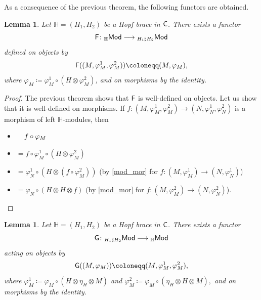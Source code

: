 \documentclass[11pt,reqno]{amsart}
\theoremstyle{plain}%
\newtheorem{lemma}[theorem]{Lemma}%
\theoremstyle{definition}
\theoremstyle{remark}
\begin{document}
As a consequence of the previous theorem, the following functors are obtained.
\begin{lemma}
Let $\mathbb{H}=(H_{1},H_{2})$ be a Hopf brace in ${\sf C}$. There exists a functor 
\[{\sf F}\colon {}_{\mathbb{H}}{\sf Mod}\longrightarrow {}_{H_{1}\sharp H_{2}}{\sf Mod}\]
defined on objects by $${\sf F}((M,\varphi_{M}^{1},\varphi_{M}^{2}))\coloneqq(M,\varphi_{M}),$$ where $\varphi_{M}\coloneqq\varphi_{M}^{1}\circ(H\otimes\varphi_{M}^{2})$, and on morphisms by the identity.
\end{lemma}
\begin{proof}
	The previous theorem shows that ${\sf F}$ is well-defined on objects. Let us show that it is well-defined on morphisms. If $f\colon (M,\varphi_{M}^{1},\varphi_{M}^{2})\rightarrow (N,\varphi_{N}^{1},\varphi_{N}^{2})$ is a morphism of left $\mathbb{H}$-modules, then
	\begin{itemize}
		\itemindent=-32pt 
		\item[ ]$\hspace{0.38cm}f\circ \varphi_{M}$
		\item[] $=f\circ\varphi_{M}^{1}\circ(H\otimes\varphi_{M}^{2})$
		\item[] $=\varphi_{N}^{1}\circ(H\otimes (f\circ\varphi_{M}^{2}))$ {\footnotesize (by \eqref{mod_mor} for $f\colon (M,\varphi_{M}^{1})\rightarrow (N,\varphi_{N}^{1})$)} 
		\item[] $=\varphi_{N}\circ(H\otimes H\otimes f)$ {\footnotesize (by \eqref{mod_mor} for $f\colon (M,\varphi_{M}^{2})\rightarrow (N,\varphi_{N}^{2})$).}\qedhere
	\end{itemize}
\end{proof}
\begin{lemma}
	Let $\mathbb{H}=(H_{1},H_{2})$ be a Hopf brace in ${\sf C}$. There exists a functor 
	\[{\sf G}\colon {}_{H_{1}\sharp H_{2}}{\sf Mod}\longrightarrow {}_{\mathbb{H}}{\sf Mod}\]
	acting on objects by 
	\[{\sf G}((M,\varphi_{M}))\coloneqq(M,\varphi_{M}^{1},\varphi_{M}^{2}),\]
	where $\varphi_{M}^{1}\coloneqq \varphi_{M}\circ(H\otimes\eta_{H}\otimes M)$ and $\varphi_{M}^{2}\coloneqq \varphi_{M}\circ(\eta_{H}\otimes H\otimes M),$ and on morphisms by the identity.
\end{lemma}
\end{document}
